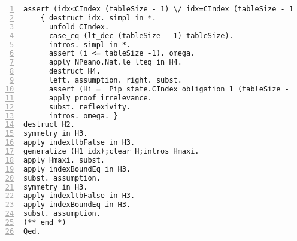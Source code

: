 \begin{appendices}
\begin{lstlisting}[xleftmargin=-.1\textwidth,
xrightmargin=-.1\textwidth,
mathescape=true,numbers=left]
assert (idx<CIndex (tableSize - 1) \/ idx=CIndex (tableSize - 1)).
    { destruct idx. simpl in *. 
      unfold CIndex.
      case_eq (lt_dec (tableSize - 1) tableSize).
      intros. simpl in *.
      assert (i <= tableSize -1). omega.
      apply NPeano.Nat.le_lteq in H4.
      destruct H4.
      left. assumption. right. subst.
      assert (Hi =  Pip_state.CIndex_obligation_1 (tableSize - 1) l).
      apply proof_irrelevance.
      subst. reflexivity.
      intros. omega. }
destruct H2.
symmetry in H3.
apply indexltbFalse in H3.
generalize (H1 idx);clear H;intros Hmaxi.
apply Hmaxi. subst.
apply indexBoundEq in H3.
subst. assumption. 
symmetry in H3.
apply indexltbFalse in H3.
apply indexBoundEq in H3.
subst. assumption.
(** end *)
Qed.

\end{lstlisting}


\end{appendices}



